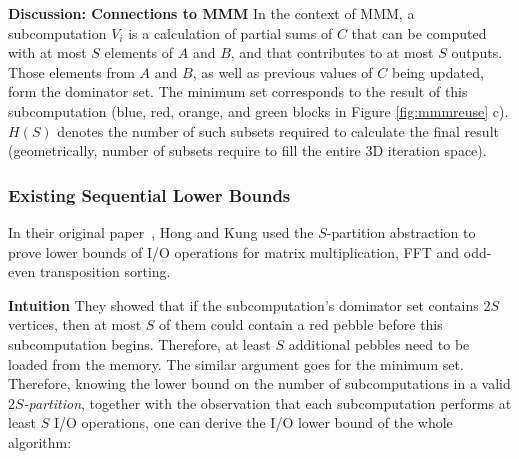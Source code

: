\documentclass[sigplan,review,anonymous]{acmart}\settopmatter{printfolios=true,printccs=false,printacmref=false}
\newcommand\greg[1]{\textcolor{blue}{[Greg: #1]}}
\newcommand\mac[1]{\textcolor{red}{[Mac: #1]}}
\newcommand{\macb}[1]{\textbf{\textsf{#1}}}
\begin{document}
\macb{Discussion: Connections to MMM}
%
In the context of MMM, a subcomputation $V_i$
is a calculation of partial sums of $C$ that can be computed with at most $S$ 
elements of $A$ and $B$, and that contributes to at most $S$ outputs. Those 
elements from $A$ and $B$, as well as previous values of $C$ being updated, 
form the
dominator set. The minimum set corresponds to 
the result of this subcomputation (blue, red, orange, and green blocks in 
Figure 
\ref{fig:mmmreuse} c). $H(S)$ denotes 
the number of such subsets required to calculate the final result 
(geometrically, number of subsets require to fill the entire 3D iteration 
space).

\subsubsection{Existing Sequential Lower Bounds}
%

In their original paper~\cite{redblue}, Hong and Kung used the $S$-partition 
abstraction to prove lower bounds of I/O operations for matrix multiplication, 
FFT and odd-even transposition sorting. 

\macb{Intuition}
%
They showed that if the 
subcomputation's dominator set contains $2S$ vertices, then at most $S$ of them 
could contain a red pebble before this subcomputation begins. Therefore, at 
least $S$ additional pebbles need to be loaded from the memory. The similar 
argument goes for the minimum set. Therefore, knowing the lower bound on the 
number of subcomputations in a valid \emph{$2S$-partition}, together with the 
observation that each subcomputation performs at least $S$ I/O operations, one 
can derive the I/O lower bound of the whole algorithm:
%
%
\end{document}
